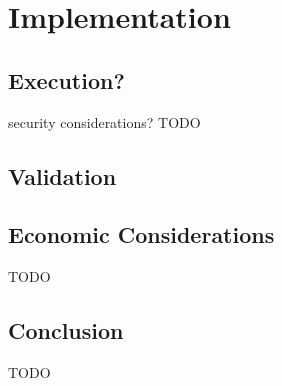 \chapter{Implementation}
\label{chap:impl}

\section{Execution?}

security considerations?
TODO

\section{Validation}

\section{Economic Considerations}

TODO

\section{Conclusion}

TODO